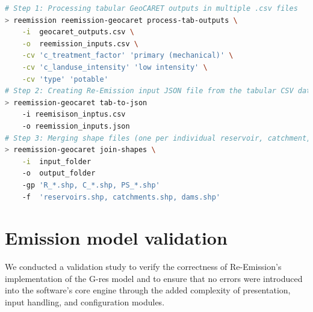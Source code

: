 \documentclass[final,1p,times]{elsarticle}
\begin{document}
\begin{minipage}{0.95\textwidth}
\begin{lstlisting}[language=bash, 
label={lst:integration_cli}, caption={Re-Emission CLI: Processing outputs from the GeoCARET reservoir and catchment processing tool.}]
# Step 1: Processing tabular GeoCARET outputs in multiple .csv files 
> reemission reemission-geocaret process-tab-outputs \
    -i  geocaret_outputs.csv \
    -o  reemission_inputs.csv \
    -cv 'c_treatment_factor' 'primary (mechanical)' \
    -cv 'c_landuse_intensity' 'low intensity' \
    -cv 'type' 'potable'
# Step 2: Creating Re-Emission input JSON file from the tabular CSV data
> reemission-geocaret tab-to-json 
    -i reemisison_inptus.csv 
    -o reemission_inputs.json
# Step 3: Merging shape files (one per individual reservoir, catchment, dam, etc.) into combined shapes per geometry type
> reemission-geocaret join-shapes \
    -i  input_folder
    -o  output_folder
    -gp 'R_*.shp, C_*.shp, PS_*.shp'
    -f  'reservoirs.shp, catchments.shp, dams.shp'
\end{lstlisting}
\end{minipage}



\section{Emission model validation}
\label{sec:validation}

We conducted a validation study to verify the correctness of Re-Emission's implementation of the G-res model and to ensure that no errors were introduced into the software’s core engine through the added complexity of presentation, input handling, and configuration modules.
\end{document}
